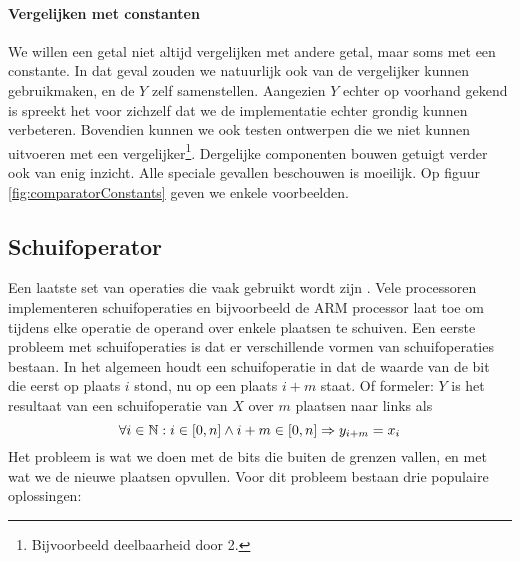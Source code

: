 \paragraph{Vergelijken met constanten}
We willen een getal niet altijd vergelijken met andere getal, maar soms met een constante. In dat geval zouden we natuurlijk ook van de vergelijker kunnen gebruikmaken, en de $Y$ zelf samenstellen. Aangezien $Y$ echter op voorhand gekend is spreekt het voor zichzelf dat we de implementatie echter grondig kunnen verbeteren. Bovendien kunnen we ook testen ontwerpen die we niet kunnen uitvoeren met een vergelijker\footnote{Bijvoorbeeld deelbaarheid door 2.}. Dergelijke componenten bouwen getuigt verder ook van enig inzicht. Alle speciale gevallen beschouwen is moeilijk. Op figuur \ref{fig:comparatorConstants} geven we enkele voorbeelden.
\subsection{Schuifoperator}
\label{ss:shiftoperators}
Een laatste set van operaties die vaak gebruikt wordt zijn . Vele processoren implementeren schuifoperaties en bijvoorbeeld de ARM processor laat toe om tijdens elke operatie de operand over enkele plaatsen te schuiven. Een eerste probleem met schuifoperaties is dat er verschillende vormen van schuifoperaties bestaan. In het algemeen houdt een schuifoperatie in dat de waarde van de bit die eerst op plaats $i$ stond, nu op een plaats $i+m$ staat. Of formeler: $Y$ is het resultaat van een schuifoperatie van $X$ over $m$ plaatsen naar links als
\begin{equation}
\forall i\in\mathbb{N}:i\in\left[0,n\right]\wedge i+m\in\left[0,n\right]\Rightarrow y_{i+m}=x_i
\end{equation}
Het probleem is wat we doen met de bits die buiten de grenzen vallen, en met wat we de nieuwe plaatsen opvullen. Voor dit probleem bestaan drie populaire oplossingen:
